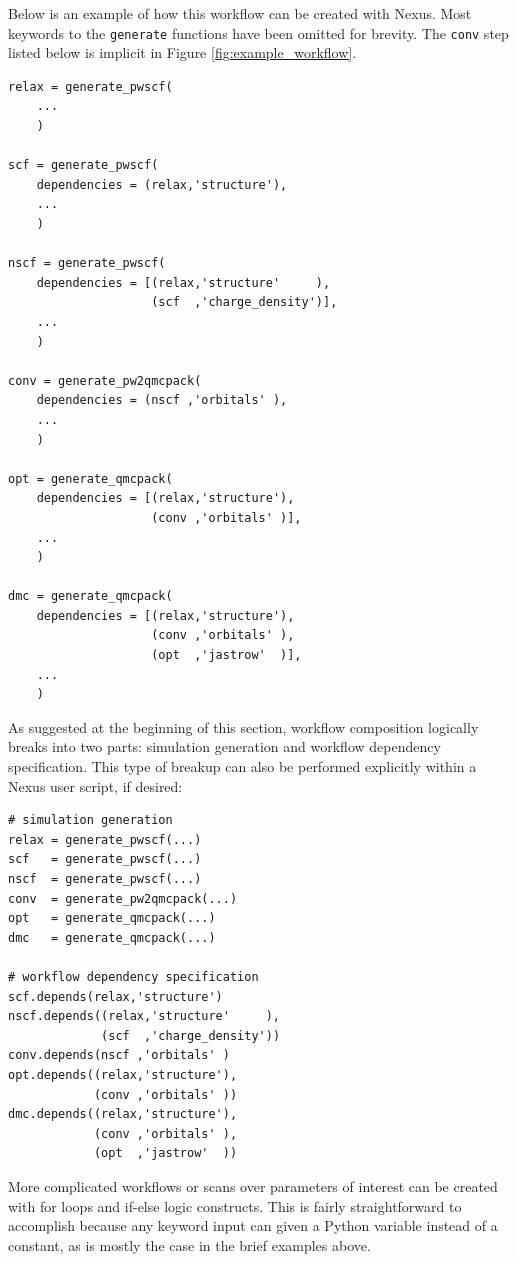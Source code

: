 \documentclass[oneside,11pt]{memoir}
\numberwithin{equation}{section}
\begin{document}
Below is an example of how this workflow can be created with Nexus.  Most keywords to the \texttt{generate} functions have been omitted for brevity.  The \texttt{conv} step listed below is implicit in Figure \ref{fig:example_workflow}.
\begin{verbatim}
relax = generate_pwscf(
    ...
    )

scf = generate_pwscf(
    dependencies = (relax,'structure'),
    ...
    )

nscf = generate_pwscf(
    dependencies = [(relax,'structure'     ),
                    (scf  ,'charge_density')],
    ...
    )

conv = generate_pw2qmcpack(
    dependencies = (nscf ,'orbitals' ),
    ...
    )

opt = generate_qmcpack(
    dependencies = [(relax,'structure'),
                    (conv ,'orbitals' )],
    ...
    )

dmc = generate_qmcpack(
    dependencies = [(relax,'structure'),
                    (conv ,'orbitals' ),
                    (opt  ,'jastrow'  )],
    ...
    )
\end{verbatim}

\noindent
As suggested at the beginning of this section, workflow composition logically breaks into two parts: simulation generation and workflow dependency specification.  This type of breakup can also be performed explicitly within a Nexus user script, if desired:
\begin{verbatim}
# simulation generation
relax = generate_pwscf(...)
scf   = generate_pwscf(...)
nscf  = generate_pwscf(...)
conv  = generate_pw2qmcpack(...)
opt   = generate_qmcpack(...)
dmc   = generate_qmcpack(...)

# workflow dependency specification
scf.depends(relax,'structure')
nscf.depends((relax,'structure'     ),
             (scf  ,'charge_density'))
conv.depends(nscf ,'orbitals' )
opt.depends((relax,'structure'),
            (conv ,'orbitals' ))
dmc.depends((relax,'structure'),
            (conv ,'orbitals' ),
            (opt  ,'jastrow'  ))
\end{verbatim}

\noindent
More complicated workflows or scans over parameters of interest can be created with for loops and if-else logic constructs.  This is fairly straightforward to accomplish because any keyword input can given a Python variable instead of a constant, as is mostly the case in the brief examples above.
\end{document}
